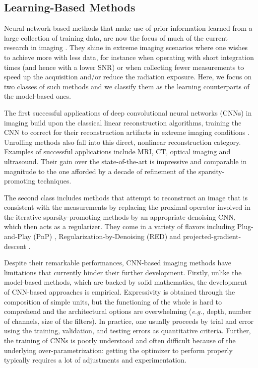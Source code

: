 \documentclass[journal]{IEEEtran}
\begin{document}
\subsection{Learning-Based Methods}
Neural-network-based methods that make use of prior information learned from a large collection of training data, are now the focus of much of the current research in imaging \cite{mccann2017convolutional,ongie2020deep}. They shine in extreme imaging scenarios where one wishes to achieve more with less data, for instance when operating with short integration times (and hence with a lower SNR) or when collecting fewer measurements to speed up the acquisition and/or reduce the radiation exposure. Here, we focus on two classes of such methods and we classify them as the learning counterparts of the model-based ones.

The first successful applications of deep convolutional neural networks (CNNs) in imaging build upon the classical linear reconstruction algorithms, training the CNN to correct for their reconstruction artifacts in extreme imaging conditions \cite{jin2017deep,chen2017low,hyun2018deep,monakhova2019learned,perdios2020cnn}. Unrolling methods \cite{gregor2010learning,chen2016trainable,sun2016deep,aggarwal2018modl,adler2018learned,monga2021algorithm} also fall into this direct, nonlinear reconstruction category. Examples of successful applications include MRI, CT, optical imaging and ultrasound. Their gain over the state-of-the-art is impressive and comparable in magnitude to the one afforded by a decade of refinement of the sparsity-promoting techniques.

The second class includes methods that attempt to reconstruct an image that is consistent with the measurements by replacing the proximal operator involved in the iterative sparsity-promoting methods by an appropriate denoising CNN, which then acts as a regularizer. They come in a variety of flavors including Plug-and-Play (PnP) \cite{venkatakrishnan2013plug,ryu2019plug,zhang2021plug,sun2021scalable}, Regularization-by-Denoising (RED) \cite{romano2017little,sun2019block,wu2020simba} and projected-gradient-descent \cite{rick2017one,gupta2018cnn}.

Despite their remarkable performances, CNN-based imaging methods have limitations that currently hinder their further development. Firstly, unlike the model-based methods, which are backed by solid mathematics, the development of CNN-based approaches is empirical. Expressivity is obtained through the composition of simple units, but the functioning of the whole is hard to comprehend and the architectural options are overwhelming (\textit{e.g.,} depth, number of channels, size of the filters). In practice, one usually proceeds by trial and error using the training, validation, and testing errors as
quantitative criteria. Further, the training of CNNs is poorly understood and often difficult because of the underlying over-parametrization: getting the optimizer to perform properly typically requires a lot of adjustments and experimentation. 
\end{document}
